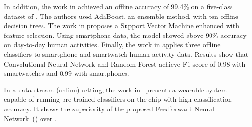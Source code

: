 In addition, the work in \cite{ugulino2012} achieved an offline accuracy of
99.4\% on a five-class dataset of \har. The authors used AdaBoost, an
ensemble method, with ten offline decision trees. The work in
\cite{ahmed2019smartphone} proposes a Support Vector Machine enhanced with
feature selection. Using smartphone data, the model showed above 90\%
accuracy on day-to-day human activities. Finally, the work in
\cite{san2018robust} applies three offline classifiers to smartphone and
smartwatch human activity data. Results show that Convolutional Neural Network and Random
Forest achieve F1 score of 0.98 with smartwatches and 0.99 with
smartphones.

In a data stream (online) setting, the work in~\cite{omid_2019} presents a wearable
system capable of running pre-trained classifiers on the chip with high classification
accuracy. It shows the superiority of the proposed Feedforward Neural
Network~(\FNN) over \knn.










